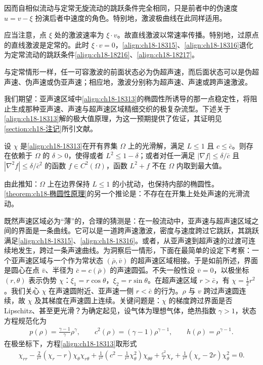 \documentclass[../../main.tex]{subfiles}
\begin{document}
因而自相似流动与定常无旋流动的跳跃条件完全相同，只是前者中的伪速度 $u=v-\xi$ 扮演后者中速度的角色。特别地，激波极曲线在此同样适用。

应当注意，点 $\xi$ 处的激波速率为 $\xi\cdot v$。故直线激波以常速率传播。特别地，过原点的直线激波是定常的。此时 $\xi\cdot v=0$，\eqref{align:ch18-18315}、\eqref{align:ch18-18316}退化为定常流动的跳跃条件\eqref{align:ch18-18216}、\eqref{align:ch18-18217}。

与定常情形一样，任一可容激波的前面状态必为伪超声速，而后面状态可以是伪超声速、伪声速或伪亚声速；相应地，激波分别称为超声速、声速或跨声速激波。

我们期望：亚声速区域中\eqref{align:ch18-18313}的椭圆性所诱导的那一点稳定性，将阻止生成那种亚声速、声速与超声速区域精细交织的极复杂流型。下述关于\eqref{align:ch18-18313}解的极大值原理，为这一预期提供了佐证，其证明见\cref{section:ch18-注记}所引文献。

\begin{theorem}[椭圆性原理]\label{theorem:ch18-椭圆性原理}
设 $\chi$ 是\eqref{align:ch18-18313}在开有界集 $\Omega$ 上的光滑解，满足 $L\leqslant 1$ 且 $c\leqslant\bar c$。则存在依赖于 $\Omega$ 的 $\delta>0$，使得或者 $L^2\leqslant 1-\delta$；或者对任一满足 $|\nabla f|\leqslant\delta/\bar c$ 且 $|\nabla^2 f|\leqslant\delta/\bar c^2$ 的函数 $f\in C^2(\Omega)$，函数 $L^2+f$ 不在 $\Omega$ 内取到最大值。
\end{theorem}

由此推知：$\Omega$ 上在边界保持 $L\leqslant 1$ 的小扰动，也保持内部的椭圆性。\cref{theorem:ch18-椭圆性原理}的另一个推论是：不存在在开集上处处声速的光滑流动。

既然声速区域必为“薄”的，合理的猜测是：在一般流动中，亚声速与超声速区域之间的界面是一条曲线。它可以是一道跨声速激波，密度与速度跨过它跳跃，其跳跃满足\eqref{align:ch18-18315}、\eqref{align:ch18-18316}。或者，从亚声速到超声速的过渡可连续地发生，跨过一条声速曲线。为洞察后一情形，下面在最简单的设定下考察：一个亚声速区域与一个作为常状态 $(\bar\rho,\bar v)$ 的超声速区域相接。于是如前所述，界面是圆心在点 $\bar v$、半径为 $\bar c=c(\bar\rho)$ 的声速圆弧。不失一般性设 $\bar v=0$，以极坐标 $(r,\theta)$ 表示伪势 $\chi$：$\xi_1=r\cos\theta$，$\xi_2=r\sin\theta$。在超声速区域 $r>\bar c$，有 $\chi=\frac12 r^2$。我们关心 $\chi$ 在声速圆附近、亚声速一侧 $r<\bar c$ 的行为。$\rho$ 与 $v$ 跨过声速圆连续，故 $\chi$ 及其梯度在声速圆上连续。关键问题是：$\chi$ 的梯度跨过界面是否 Lipschitz、甚至更光滑？为确定起见，设气体为理想气体，绝热指数 $\gamma>1$，状态方程规范化为
\begin{align}
p(\rho)=\frac{\gamma-1}{\gamma}\rho^\gamma,\qquad c^2(\rho)=(\gamma-1)\rho^{\gamma-1},\qquad h(\rho)=\rho^{\gamma-1}.
\label{align:ch18-18317}
\end{align}
在极坐标下，方程\eqref{align:ch18-18313}取形式
\begin{align}
[c^2-(\chi_r-r)^2]\chi_{rr}-\frac{2}{r^2}(\chi_r-r)\chi_\theta\chi_{r\theta}
+\frac{1}{r^2}\left(c^2-\frac{1}{r^2}\chi_\theta^2\right)\chi_{\theta\theta}
+\frac{c^2}{r}\chi_r+\frac{1}{r^3}(\chi_r-2r)\chi_\theta^2=0.
\label{align:ch18-18318}
\end{align}
\end{document}

